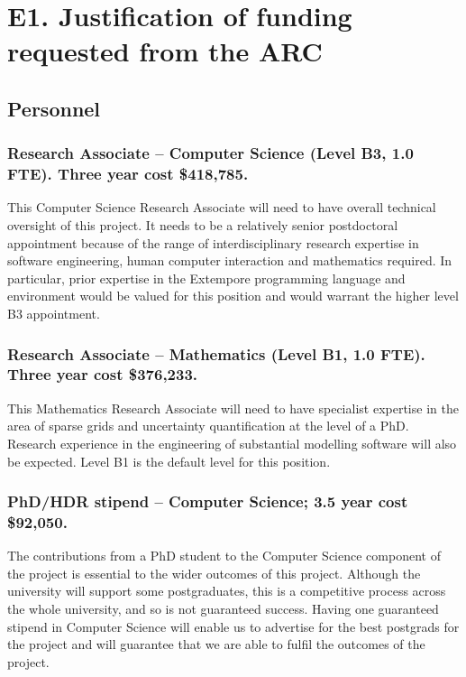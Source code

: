 \documentclass[a4paper,twoside,12pt,compact]{article}
\author{}
\date{\today}
\begin{document}
\section*{E1. Justification of funding requested from the ARC}
\label{sec:justificatoin}

\subsection*{Personnel}


\subsubsection*{Research Associate – Computer Science (Level B3, 1.0 FTE). Three year cost \$418,785.}

This Computer Science Research Associate will need to have overall technical oversight of this project. It needs to be a relatively senior postdoctoral appointment because of the range of interdisciplinary research expertise in software engineering, human computer interaction and mathematics required. In particular, prior expertise in the Extempore programming language and environment would be valued for this position and would warrant the higher level B3 appointment.


\subsubsection*{Research Associate – Mathematics (Level B1, 1.0 FTE).  Three year cost \$376,233.}

This Mathematics Research Associate will need to have specialist expertise in the area of sparse grids and uncertainty quantification at the level of a PhD.  Research experience in the engineering of substantial modelling software will also be expected. Level B1 is the default level for this position.  

\subsubsection*{PhD/HDR stipend – Computer Science;  3.5 year cost \$92,050.}

The contributions from a PhD student to the Computer Science component of the project is essential to the wider outcomes of this project.
Although the university will support some postgraduates, this is a competitive
process across the whole university, and so is not guaranteed success. Having one guaranteed stipend in Computer Science will enable us to advertise for the best postgrads for the project and will guarantee that we are able to fulfil the outcomes of the project. 
\end{document}
